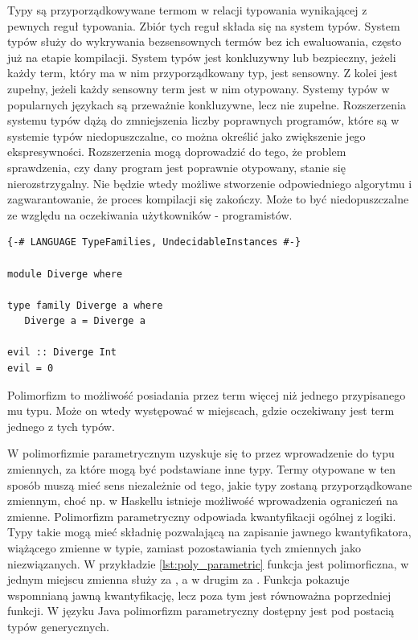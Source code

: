 {Typy są przyporządkowywane termom w relacji typowania wynikającej z pewnych
reguł typowania. Zbiór tych reguł składa się na system typów. System typów służy do
wykrywania bezsensownych termów bez ich ewaluowania, często już na etapie kompilacji.
System typów jest konkluzywny lub bezpieczny,
jeżeli każdy term, który ma w nim przyporządkowany typ, jest sensowny. Z kolei
jest zupełny, jeżeli każdy sensowny term jest w nim otypowany. Systemy typów w
popularnych językach są przeważnie konkluzywne, lecz nie zupełne. Rozszerzenia
systemu typów dążą do zmniejszenia liczby poprawnych programów, które są w
systemie typów niedopuszczalne, co można określić jako zwiększenie jego
ekspresywności. Rozszerzenia mogą doprowadzić do tego, że problem sprawdzenia,
czy dany program jest poprawnie otypowany, stanie się nierozstrzygalny. Nie
będzie wtedy możliwe stworzenie odpowiedniego algorytmu i zagwarantowanie, że
proces kompilacji się zakończy. Może to być niedopuszczalne ze względu na
oczekiwania użytkowników - programistów\cite{TAPL}.

\begin{lstlisting}[float,label={lst:types_diverge},
                   caption={Przykład programu, dla którego statyczne sprawdzanie typów w GHC się nie zakończy.}]
{-# LANGUAGE TypeFamilies, UndecidableInstances #-}

module Diverge where

type family Diverge a where
   Diverge a = Diverge a

evil :: Diverge Int
evil = 0
\end{lstlisting}

Polimorfizm to możliwość posiadania przez term więcej niż jednego przypisanego
mu typu. Może on wtedy występować w miejscach, gdzie oczekiwany jest term jednego
z tych typów.

W polimorfizmie parametrycznym uzyskuje się to przez wprowadzenie
do typu zmiennych, za które mogą być podstawiane inne typy. Termy otypowane w ten
sposób muszą mieć sens niezależnie od tego, jakie typy zostaną przyporządkowane
zmiennym, choć np. w Haskellu istnieje możliwość wprowadzenia ograniczeń na zmienne.
Polimorfizm parametryczny odpowiada kwantyfikacji ogólnej z logiki. Typy takie
mogą mieć składnię pozwalającą na zapisanie jawnego kwantyfikatora, wiążącego
zmienne w typie, zamiast pozostawiania tych zmiennych jako niezwiązanych.
W przykładzie \ref{lst:poly_parametric} funkcja  jest polimorficzna,
w jednym miejscu zmienna  służy za , a w drugim za .
Funkcja  pokazuje wspomnianą jawną kwantyfikację, lecz poza tym jest
równoważna poprzedniej funkcji. W języku Java polimorfizm parametryczny
dostępny jest pod postacią typów generycznych.

}
